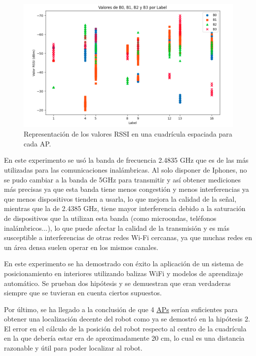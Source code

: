\begin{figure}[H]
  \centering
  \includegraphics[scale=0.4]{figs/vals2} %
  \caption{ Representación de los valores RSSI en una cuadrícula espaciada para cada AP.}
  \label{fig:vals2}
\end{figure} 

En este experimento se usó la banda de frecuencia 2.4835 GHz que es de las más utilizadas para las comunicaciones inalámbricas. Al solo disponer de Iphones, no se pudo cambiar a la banda de 5GHz para transmitir y así obtener mediciones más precisas ya que esta banda tiene menos congestión y menos interferencias ya que menos dispositivos tienden a usarla, lo que mejora la calidad de la señal, mientras que la de 2.4385 GHz, tiene mayor interferencia debido a la saturación de dispositivos que la utilizan esta banda (como microondas, teléfonos inalámbricos...), lo que puede afectar la calidad de la transmisión y es más susceptible a interferencias de otras redes Wi-Fi cercanas, ya que muchas redes en un área densa suelen operar en los mismos canales.

En este experimento se ha demostrado con éxito la aplicación de un sistema de posicionamiento en interiores utilizando balizas WiFi y modelos de aprendizaje automático. Se prueban dos hipótesis y se demuestran que eran verdaderas siempre que se tuvieran en cuenta ciertos supuestos.

Por último, se ha llegado a la conclusión de que 4 \hyperlink{APs}{APs} serían suficientes para obtener una localización decente del robot como ya se demostró en la hipótesis 2. El error en el cálculo de la posición del robot respecto al centro de la cuadrícula en la que debería estar era de aproximadamente 20 cm, lo cual es una distancia razonable y útil para poder localizar al robot.


